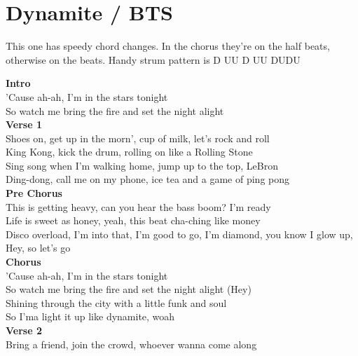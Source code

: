 \section{Dynamite / BTS}\label{sec:dynamite}
\small{This one has speedy chord changes. In the chorus they're on the half beats, otherwise on the beats. Handy strum pattern is D UU D UU DUDU}
\BminorSeven
\Eminor
\Amajor
\DmajorEasy
\FsharpMinor
\Bmajor
\EmajorEasy

\textbf{Intro}\\
'Cause ah-ah, I'm in the stars tonight  \\
So watch me bring the fire and set the night alight\\
\textbf{Verse 1}\\
Shoes on, get up in the morn', cup of milk, let's rock and roll\\
King Kong, kick the drum, rolling on like a Rolling Stone\\
Sing song when I'm walking home, jump up to the top, LeBron\\
Ding-dong, call me on my phone, ice tea and a game of ping pong\\
\textbf{Pre Chorus}\\
This is getting heavy, can you hear the bass boom? I'm ready\\
Life is sweet as honey, yeah, this beat cha-ching like money\\
Disco overload, I'm into that, I'm good to go, I'm diamond, you know I glow up, Hey, so let's go\\
\textbf{Chorus}\\
'Cause ah-ah, I'm in the stars tonight\\
So watch me bring the fire and set the night alight (Hey)\\
Shining through the city with a little funk and soul\\
So I'ma light it up like dynamite, woah\\
\textbf{Verse 2}\\
Bring a friend, join the crowd, whoever wanna come along\\
